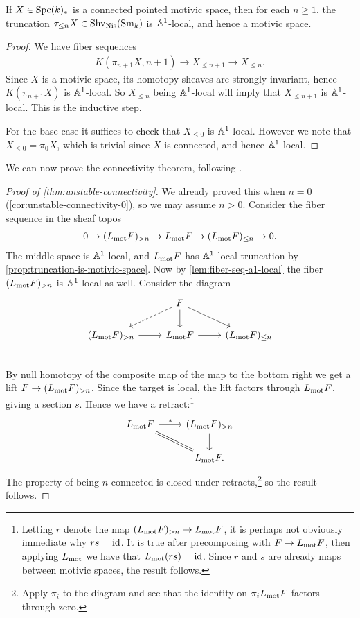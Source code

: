 \documentclass[11pt,openany]{book}
\begin{document}
\begin{proposition}\label{prop:truncation-is-motivic-space} 
\cite[1.8(2)]{bachmannstrongly}
If $X \in \mathrm{Spc}(k)_\ast$ is a connected pointed motivic space, then for each $n\ge 1$, the truncation $\tau_{\le n}X \in \mathrm{Shv}_{\mathrm{Nis}}(\mathrm{Sm}_k)$ is $\mathbb{A}^1$-local, and hence a motivic space.
\end{proposition}
\begin{proof} We have fiber sequences
\begin{align*}
    K(\pi_{n+1}X, n+1) \to X_{\le n+1} \to X_{\le n}.
\end{align*}
Since $X$ is a motivic space, its homotopy sheaves are strongly invariant, hence $K(\pi_{n+1} X)$ is $\mathbb{A}^1$-local. So $X_{\le n}$ being $\mathbb{A}^1$-local will imply that $X_{\le n+1}$ is $\mathbb{A}^1$-local. This is the inductive step.

For the base case it suffices to check that $X_{\le 0}$ is $\mathbb{A}^1$-local. However we note that $X_{\le 0} = \pi_0 X$, which is trivial since $X$ is connected, and hence $\mathbb{A}^1$-local.
\end{proof}



We can now prove the connectivity theorem, following \cite[1.10]{bachmannstrongly}.

\begin{proof}[Proof of \autoref{thm:unstable-connectivity}] We already proved this when $n=0$ (\autoref{cor:unstable-connectivity-0}), so we may assume $n>0$. Consider the fiber sequence in the sheaf topos
\begin{align*}
    0 \to (L_{\mathrm{mot}} F)_{>n} \to L_{\mathrm{mot}} F \to (L_{\mathrm{mot}} F)_{\le n} \to 0.
\end{align*}
The middle space is $\mathbb{A}^1$-local, and $L_{\mathrm{mot}} F$ has $\mathbb{A}^1$-local truncation by \autoref{prop:truncation-is-motivic-space}. Now by \autoref{lem:fiber-seq-a1-local} the fiber $(L_{\mathrm{mot}} F)_{>n}$ is $\mathbb{A}^1$-local as well. Consider the diagram
\[ \begin{tikzcd}
     & F\dar\ar[dr]\ar[dl,dashed]\\
    (L_\mot F)_{>n}\rar & L_\mot F \rar & (L_\mot F)_{\le n}\\
\end{tikzcd} \]
By null homotopy of the composite map of the map to the bottom right we get a lift $F \to (L_{\mathrm{mot}} F)_{>n}$. Since the target is local, the lift factors through $L_{\mathrm{mot}} F$, giving a section $s$. Hence we have a retract:\footnote{%
Letting $r$ denote the map $(L_{\mathrm{mot}} F)_{>n} \to L_{\mathrm{mot}} F$, it is perhaps not obviously immediate why $rs = \mathrm{id}$. It is true after precomposing with $F \to L_{\mathrm{mot}} F$, then applying $L_{\mathrm{mot}}$ we have that $L_{\mathrm{mot}}(rs) = \mathrm{id}$. Since $r$ and $s$ are already maps between motivic spaces, the result follows.%
}
%
\[ \begin{tikzcd}
    L_\mot F\rar["s" above]\ar[dr,equal] & (L_\mot F)_{>n}\dar\\
     & L_\mot F.
\end{tikzcd} \]
The property of being $n$-connected is closed under retracts,\footnote{Apply $\pi_i$ to the diagram and see that the identity on $\pi_i L_{\mathrm{mot}} F$ factors through zero.} so the result follows.
\end{proof}
\end{document}
